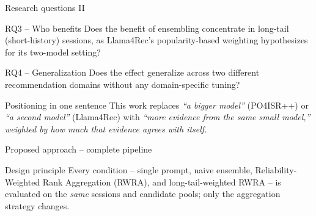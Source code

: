 \documentclass[aspectratio=169,12pt]{beamer}
\begin{document}
\begin{frame}{Research questions II}
\begin{block}{RQ3 -- Who benefits}
Does the benefit of ensembling concentrate in long-tail (short-history)
sessions, as Llama4Rec's popularity-based weighting hypothesizes for its
two-model setting?
\end{block}

\vspace{0.5em}
\begin{block}{RQ4 -- Generalization}
Does the effect generalize across two different recommendation domains
without any domain-specific tuning?
\end{block}

\vspace{0.6em}
\begin{exampleblock}{Positioning in one sentence}
This work replaces \emph{``a bigger model''} (PO4ISR++) or \emph{``a second
model''} (Llama4Rec) with \emph{``more evidence from the same small
model,'' weighted by how much that evidence agrees with itself.}
\end{exampleblock}
\end{frame}

\begin{frame}{Proposed approach -- complete pipeline}
\centering
{}

\vspace{0.6em}
\begin{block}{Design principle}
Every condition -- single prompt, naive ensemble, Reliability-Weighted Rank
Aggregation (RWRA), and long-tail-weighted RWRA -- is evaluated on the
\emph{same} sessions and candidate pools; only the aggregation strategy
changes.
\end{block}
\end{frame}
\end{document}
